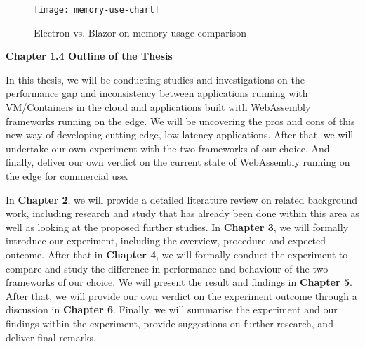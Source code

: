 \bigskip
\begin{figure}[hp]
\centering
\texttt{[image: memory-use-chart]}
\caption{\footnotesize{Electron vs. Blazor on memory usage comparison}}
\captionsetup{aboveskip=0pt,font=it}
\end{figure}
\bigskip

\textbf{{\Large Chapter 1.4 Outline of the Thesis}}
\bigskip

In this thesis, we will be conducting studies and investigations on the performance gap and inconsistency between applications running with VM/Containers in the cloud and applications built with WebAssembly frameworks running on the edge. We will be uncovering the pros and cons of this new way of developing cutting-edge, low-latency applications. After that, we will undertake our own experiment with the two frameworks of our choice. And finally, deliver our own verdict on the current state of WebAssembly running on the edge for commercial use.

In \textbf{Chapter 2}, we will provide a detailed literature review on related background work, including research and study that has already been done within this area as well as looking at the proposed further studies. In \textbf{Chapter 3}, we will formally introduce our experiment, including the overview, procedure and expected outcome. After that in \textbf{Chapter 4}, we will formally conduct the experiment to compare and study the difference in performance and behaviour of the two frameworks of our choice. We will present the result and findings in \textbf{Chapter 5}. After that, we will provide our own verdict on the experiment outcome through a discussion in \textbf{Chapter 6}. Finally, we will summarise the experiment and our findings within the experiment, provide suggestions on further research, and deliver final remarks.